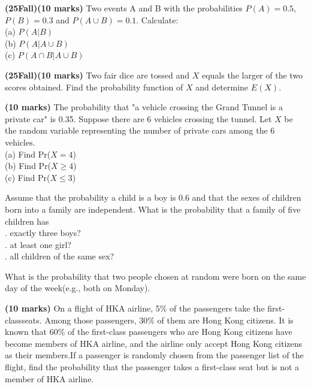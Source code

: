 \documentclass{article}
\begin{document}
\noindent \textbf{(25Fall)(10 marks)} Two events A and B with the probabilities $P(A)=0.5$, $P(B)=0.3$ and $P(A \cup B) = 0.1$. Calculate:\\
(a) $P(A | B)$ \\
(b) $P(A | A \cup B)$ \\
(c) $P(A \cap B | A \cup B)$ \\

\vspace{3\baselineskip}

\noindent \textbf{(25Fall)(10 marks)} Two fair dice are tossed and $X$ equals the larger of the two scores obtained. Find the probability function of $X$ and determine $E(X)$. \\

\vspace{3\baselineskip}

\noindent \textbf{(10 marks)} The probability that "a vehicle crossing the Grand Tunnel is a private car" is 0.35. Suppose there are 6 vehicles crossing the tunnel. Let $X$ be the random variable representing the number of private cars among the 6 vehicles.\\
\indent (a) Find Pr($X = 4$) \\
\indent (b) Find Pr($X \ge 4$) \\
\indent (c) Find Pr($X \le 3$) \\

\vspace{3\baselineskip}

\noindent Assume that the probability a child is a boy is 0.6 and that the sexes of children born into a family are independent. What is the probability that a family of five children has \\
. exactly three boys? \\
. at least one girl? \\
. all children of the same sex? \\

\vspace{3\baselineskip}

\noindent What is the probability that two people chosen at random were born on the same day of the week(e.g., both on Monday).\\

\vspace{3\baselineskip}

\noindent \textbf{(10 marks)} On a flight of HKA airline, 5\% of the passengers take the first-classseats. Among those passengers, 30\% of them are Hong Kong citizens. It is known that 60\% of the first-class passengers who are Hong Kong citizens have become members of HKA  airline, and the airline only accept Hong Kong citizens as their members.If a passenger is  randomly chosen from the passenger list of the flight, find the probability that the passenger takes a first-class seat but is not a member of HKA airline.\\
\end{document}
